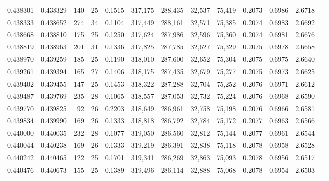 \begin{tabular}{rrrrrrrrrrrrr}
0.438301 & 0.438329 &    140 &    25 &                                     0.1515 & 317,175 & 288,435 &  32,537 &  75,419 & 0.2073 & 0.6986 & 2.6718 \\
0.438333 & 0.438652 &    274 &    34 &                                     0.1104 & 317,449 & 288,161 &  32,571 &  75,385 & 0.2074 & 0.6983 & 2.6692 \\
0.438668 & 0.438810 &    175 &    25 &                                     0.1250 & 317,624 & 287,986 &  32,596 &  75,360 & 0.2074 & 0.6981 & 2.6676 \\
0.438819 & 0.438963 &    201 &    31 &                                     0.1336 & 317,825 & 287,785 &  32,627 &  75,329 & 0.2075 & 0.6978 & 2.6658 \\
0.438970 & 0.439259 &    185 &    25 &                                     0.1190 & 318,010 & 287,600 &  32,652 &  75,304 & 0.2075 & 0.6975 & 2.6640 \\
0.439261 & 0.439394 &    165 &    27 &                                     0.1406 & 318,175 & 287,435 &  32,679 &  75,277 & 0.2075 & 0.6973 & 2.6625 \\
0.439402 & 0.439455 &    147 &    25 &                                     0.1453 & 318,322 & 287,288 &  32,704 &  75,252 & 0.2076 & 0.6971 & 2.6612 \\
0.439487 & 0.439769 &    235 &    28 &                                     0.1065 & 318,557 & 287,053 &  32,732 &  75,224 & 0.2076 & 0.6968 & 2.6590 \\
0.439770 & 0.439825 &     92 &    26 &                                     0.2203 & 318,649 & 286,961 &  32,758 &  75,198 & 0.2076 & 0.6966 & 2.6581 \\
0.439834 & 0.439990 &    169 &    26 &                                     0.1333 & 318,818 & 286,792 &  32,784 &  75,172 & 0.2077 & 0.6963 & 2.6566 \\
0.440000 & 0.440035 &    232 &    28 &                                     0.1077 & 319,050 & 286,560 &  32,812 &  75,144 & 0.2077 & 0.6961 & 2.6544 \\
0.440044 & 0.440238 &    169 &    26 &                                     0.1333 & 319,219 & 286,391 &  32,838 &  75,118 & 0.2078 & 0.6958 & 2.6528 \\
0.440242 & 0.440465 &    122 &    25 &                                     0.1701 & 319,341 & 286,269 &  32,863 &  75,093 & 0.2078 & 0.6956 & 2.6517 \\
0.440476 & 0.440673 &    155 &    25 &                                     0.1389 & 319,496 & 286,114 &  32,888 &  75,068 & 0.2078 & 0.6954 & 2.6503 \\

\end{tabular}
